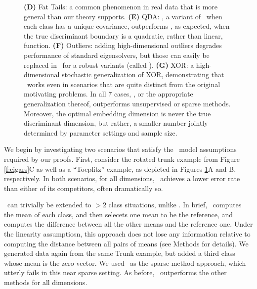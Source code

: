 \documentclass[10pt]{article}
\begin{document}
\begin{figure}
{\textbf{(D)} Fat Tails: a common phenomenon in real data that is more general than our theory supports.
\textbf{(E)} QDA: \Qoq, a variant of \Lol~when each class has a unique covariance, outperforms \Lol, as expected, when the true discriminant boundary is a quadratic, rather than linear, function.
\textbf{(F)} Outliers: adding high-dimensional outliers degrades performance of standard eigensolvers, but those can easily be replaced in \Lol~for a robust variants (called \Lrl).
\textbf{(G)} XOR: a high-dimensional stochastic generalization of XOR, demonstrating that \Qoq~works even in scenarios that are quite distinct from the original motivating problems.
In all 7 cases, \Lol, or the appropriate generalization thereof, outperforms unsupervised or sparse methods.  Moreover, the optimal embedding dimension is never the true discriminant dimension, but rather, a smaller number jointly determined by parameter settings and sample size.
}
\label{f:properties}
\end{figure}





 We begin by investigating two scenarios that satisfy the \Lda~model assumptions required by our proofs. First, consider  the rotated trunk example from Figure \ref{f:cigars}{\color{magenta}C} as well as a ``Toeplitz'' example, as depicted in Figures \ref{f:properties}{\color{magenta}A} and {\color{magenta}B}, respectively.  In both scenarios, for all dimensions, \Lol~achieves a lower error rate than either of its competitors, often dramatically so.


 \Lol~can trivially be extended to $>2$ class situations, unlike \Road.  In brief, \Lol~computes the mean of each class, and then selecets one mean to be the reference, and computes the difference between all the other means and the reference one.  Under the linearity assumptiosn, this approach does not lose any information relative to computing the distance between all pairs of means  (see Methods for details).  We generated data again from the same Trunk example, but added a third class whose mean is the zero vector.  We used \Lasso~as the sparse method approach, which utterly fails in this near sparse setting.  As before, \Lol~outperforms the other methods for all dimensions. 
\end{document}
